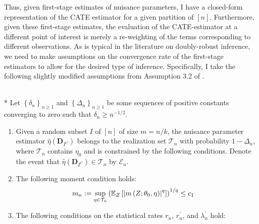 Thus, given first-stage estimates of nuisance parameters, I have a closed-form representation of the CATE estimator for a given partition of $[n]$.
Furthermore, given these first-stage estimates, the evaluation of the CATE-estimator at a different point of interest is merely a re-weighting of the terms corresponding to different observations.
As is typical in the literature on doubly-robust inference, we need to make assumptions on the convergence rate of the first-stage estimators to allow for the desired type of inference.
Specifically, I take the following slightly modified assumptions from Assumption 3.2 of \citet{chernozhukov_doubledebiased_2018}. 
\begin{boxD}
    \begin{asm}\label{asm:DDML_Rate_Cond}\mbox{}\\*
        Let $\left\{\delta_n\right\}_{n \geq 1}$ and $\left\{\Delta_n\right\}_{n \geq 1}$ be some sequences of positive constants converging to zero such that $\delta_n \geq n^{-1 / 2}$. 
        \begin{enumerate}
            \item Given a random subset $I$ of $[n]$ of size $m = n/k$, the nuisance parameter estimator $\hat{\eta}\left(\mathbf{D}_{I^{C}}\right)$ belongs to the realization set $\mathcal{T}_{n}$ with probability $1 - \Delta_{n}$, where $\mathcal{T}_{n}$ contains $\eta_{0}$ and is constrained by the following conditions. 
            Denote the event that $\hat{\eta}\left(\mathbf{D}_{I^{C}}\right) \in \mathcal{T}_{n}$ by $\mathcal{E}_{n}$.
            \item The following moment condition holds:
            \begin{align}
                m_{n} 
                & :=\sup_{\eta \in \mathcal{T}_{n}}\left(\mathbb{E}_{Z}\left[\left|m\left(Z; \theta_0, \eta\right)\right|^q\right]\right)^{1 / q}
                \leq c_1
            \end{align}
            \item The following conditions on the statistical rates $r_{n}$, $r_{n}^{\prime}$, and $\lambda_{n}^{\prime}$ hold:
            \begin{align}

\end{align}
\end{enumerate}
\end{asm}
\end{boxD}
